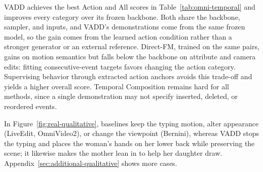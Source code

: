VADD achieves the best Action and All scores in
Table~\ref{tab:omni-temporal} and improves every category over its frozen
backbone. Both share the backbone, sampler, and inputs, and VADD's
demonstrations come from the same frozen model, so the gain comes from the
learned action condition rather than a stronger generator or an external
reference. Direct-FM, trained on the same pairs, gains on motion semantics
but falls below the backbone on attribute and camera edits: fitting
consecutive-event targets favors changing the action category. Supervising
behavior through extracted action anchors avoids this trade-off and yields
a higher overall score. Temporal Composition remains hard for all methods,
since a single demonstration may not specify inserted, deleted, or
reordered events.

In Figure~\ref{fig:real-qualitative}, baselines keep the typing motion,
alter appearance (LiveEdit, OmniVideo2), or change the viewpoint (Bernini),
whereas VADD stops the typing and places the woman's hands on her lower
back while preserving the scene; it likewise makes the mother lean in to
help her daughter draw. Appendix~\ref{sec:additional-qualitative} shows
more cases.
